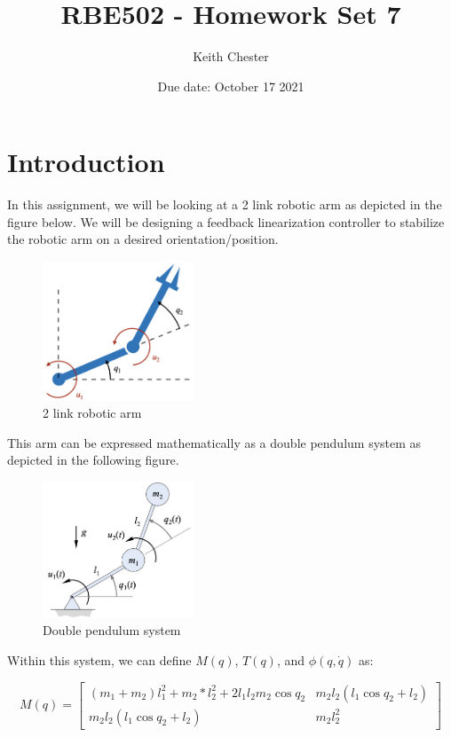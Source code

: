 \documentclass{article}
\title{RBE502 - Homework Set 7}
\author{Keith Chester}
\date{Due date: October 17 2021}
\begin{document}
\maketitle

\section*{Introduction}

In this assignment, we will be looking at a 2 link robotic arm as depicted in the figure below. We will be designing a feedback linearization controller to stabilize the robotic arm on a desired orientation/position.

\begin{figure}[H]
    \centering
    \includegraphics[width = 0.4\textwidth]{figures/2D-rr.001.jpeg}
    \caption{2 link robotic arm}
    \label{fig:robot-arm}
\end{figure}

This arm can be expressed mathematically as a double pendulum system as depicted in the following figure.

\begin{figure}
    \centering
    \includegraphics[width=0.4\textwidth]{figures/doublependulum.jpg}
    \caption{Double pendulum system}
    \label{fig:double-pendulum}
\end{figure}

Within this system, we can define $M(q)$, $T(q)$, and $\phi(q, \dot{q})$ as:

\begin{equation}
    M(q) = \begin{bmatrix}
        (m_1 + m_2)l_1^2+m_2*l_2^2+2l_1l_2m_2\cos{q_2} & m_2l_2(l_1\cos{q_2}+l_2) \\
        m_2l_2(l_1\cos{q_2}+l_2) & m_2l_2^2
    \end{bmatrix}
\end{equation}
\end{document}
